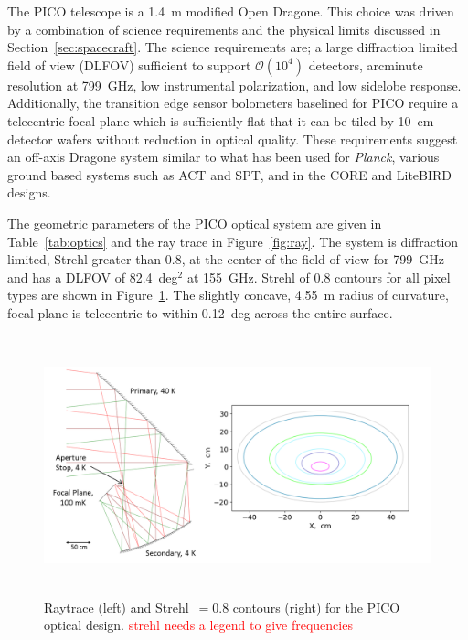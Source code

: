 \documentclass[]{spie}  %
\newcommand{\comr}[1]{\textcolor{red}{#1}}
\begin{document}
The PICO telescope is a 1.4~m modified Open Dragone.  This choice was driven by a combination of science requirements and the physical limits 
discussed in Section~\ref{sec:spacecraft}.  The science requirements are; a large diffraction limited field of view (DLFOV) sufficient to 
support $\mathcal{O}(10^4)$ detectors, arcminute resolution at 799~GHz, low instrumental polarization, and low sidelobe response. Additionally, 
the transition edge sensor bolometers baselined for PICO require a telecentric focal plane which is sufficiently flat that it can be tiled by 
10~cm detector wafers without reduction in optical quality. These requirements suggest an off-axis Dragone system\cite{dragone} similar 
to what has been used for \textit{Planck}\cite{planck2000_optics}, various ground based systems such as ACT\cite{ACT2011_optics} and SPT\cite{SPT2008_optics}, 
and in the CORE\cite{core2018_inst} and LiteBIRD\cite{LB2016_optics} designs.

The geometric parameters of the PICO optical system are given in Table~\ref{tab:optics} and the ray trace in Figure~\ref{fig:ray}. The 
system is diffraction limited, Strehl greater than 0.8, at the center of the field of view for 799~GHz and has a DLFOV of 82.4~deg$^2$ at 
155~GHz.  Strehl of 0.8 contours for all pixel types are shown in Figure~\ref{fig:strehl}. The slightly concave, 4.55~m radius of curvature, 
focal plane is telecentric to within 0.12~deg across the entire surface.

\begin{figure} [ht]
\begin{center}
\includegraphics[height=7.5cm]{jpl_ray_strehl.png}
\end{center}
\caption { \label{fig:ray} \label{fig:strehl} 
Raytrace (left) and Strehl~$=0.8$ contours (right) for the PICO optical design. \comr{strehl needs a legend to give frequencies}
}
\end{figure} 
\end{document}
